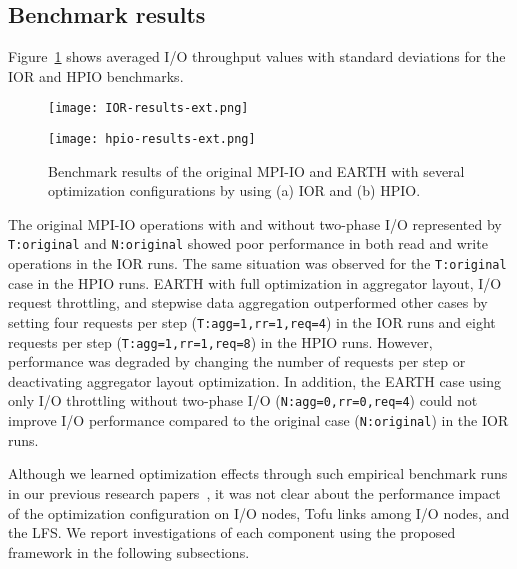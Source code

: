 \documentclass{jhps}
\begin{document}
\subsection{Benchmark results}

Figure~\ref{fig:IOR_HPIO_PERF} shows averaged I/O throughput values
with standard deviations for the IOR and HPIO benchmarks.
%
\begin{figure}[tb]
\centering
\begin{minipage}[t]{0.46\textwidth}
 \centering
 \texttt{[image: IOR-results-ext.png]}
 \label{fig:IOR_PERF}
\end{minipage}
%
\noindent
\begin{minipage}[t]{0.46\textwidth}
 \texttt{[image: hpio-results-ext.png]}
 \label{fig:HPIO_PERF}
\end{minipage}
\caption{
Benchmark results of the original MPI-IO and EARTH with several optimization
configurations by using (a) IOR and (b) HPIO.}
\label{fig:IOR_HPIO_PERF}
\end{figure}
%

The original MPI-IO operations with and without two-phase I/O represented by
{\tt T:original} and {\tt N:original} showed poor performance in both read and write
operations in the IOR runs.
The same situation was observed for the {\tt T:original} case in the HPIO runs.
EARTH with full optimization in aggregator layout, I/O request throttling,
and stepwise data aggregation outperformed other cases by setting four requests per step
({\tt T:agg=1,rr=1,req=4}) in the IOR runs and eight requests per step
({\tt T:agg=1,rr=1,req=8}) in the HPIO runs.
However, performance was degraded by changing the number of requests per step
or deactivating aggregator layout optimization.
In addition, the EARTH case using only I/O throttling without two-phase I/O
({\tt N:agg=0,rr=0,req=4}) could not improve I/O performance
compared to the original case ({\tt N:original}) in the IOR runs.

Although we learned optimization effects through such empirical benchmark runs
in our previous research papers~\cite{tsujita:WS_EuroMPI2014,tsujita:hpcasia18},
it was not clear about the performance impact of the optimization configuration
on I/O nodes, Tofu links among I/O nodes, and the LFS.
We report investigations of each component using the proposed framework
in the following subsections.

\end{document}
